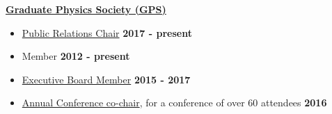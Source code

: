 \documentclass[margin]{res}
\begin{document}
\begin{resume}
\textbf{\href{gradphysics.nd.edu}{Graduate Physics Society (GPS)}}%
\begin{itemize}\itemsep -2pt
    \item[] \href{http://gradphysics.nd.edu/about-us/committee-chairs/}{Public Relations Chair} \hfill {\bf 2017 - present}
    \item[] Member \hfill {\bf 2012 - present}
    \item[] \href{http://gradphysics.nd.edu/about-us/executive-board/}{Executive Board Member} \hfill {\bf 2015 - 2017}
    \item[] \href{http://gradphysics.nd.edu/conference/gpsac-2016/}{Annual Conference co-chair}, for a conference of over 60 attendees \hfill {\bf 2016}
\end{itemize} \vspace{-12pt}

\end{resume}
\end{document}
